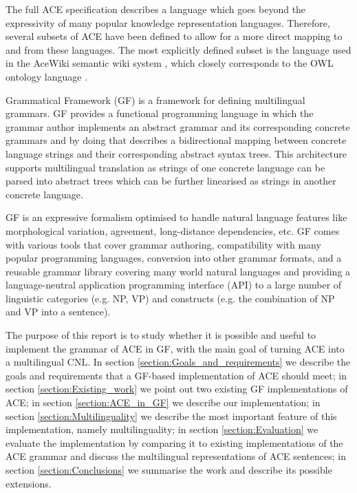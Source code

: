 \documentclass[a4paper]{article}
\begin{document}
The full ACE specification describes a language which goes beyond the
expressivity of many popular knowledge representation languages. Therefore,
several subsets of ACE have been defined to allow for a more direct
mapping to and from these languages. The most explicitly defined subset
is the language used in the AceWiki semantic wiki system
\cite{kuhn2010doctoralthesis}, which closely corresponds to the OWL ontology
language \cite{OWL_2_Web_Ontology_Language_Document_Overview}.

Grammatical Framework (GF) \cite{ranta:book2011}
is a framework for defining multilingual grammars.
GF provides a functional programming language in which
the grammar author implements an abstract grammar and its corresponding
concrete grammars and by doing that
describes a bidirectional mapping between concrete language strings and
their corresponding abstract syntax trees. This architecture supports
multilingual translation as strings of one concrete language can be parsed into
abstract trees which can be further linearised as strings in another concrete
language.

GF is an expressive formalism optimised to handle natural language features
like morphological variation, agreement, long-distance dependencies, etc.
GF comes with various tools that
cover grammar authoring, compatibility with many popular programming languages,
conversion into other grammar formats, and a reusable grammar library covering
many world natural languages and providing a language-neutral application
programming interface (API) to a large
number of linguistic categories (e.g. NP, VP) and constructs
(e.g. the combination of NP and VP into a sentence).

The purpose of this report is to study whether it is possible and useful to
implement the grammar of ACE in GF, with the main goal of turning ACE into
a multilingual CNL.
In section \ref{section:Goals_and_requirements} we describe the goals and
requirements that a GF-based implementation of ACE should meet;
in section \ref{section:Existing_work} we point out two existing
GF implementations of ACE;
in section \ref{section:ACE_in_GF} we describe our implementation;
in section \ref{section:Multilinguality} we describe the most important feature
of this implementation, namely multilinguality;
in section \ref{section:Evaluation} we evaluate the implementation by comparing
it to existing implementations of the ACE grammar and discuss the multilingual
representations of ACE sentences;
in section \ref{section:Conclusions} we summarise the work and
describe its possible extensions.
\end{document}
